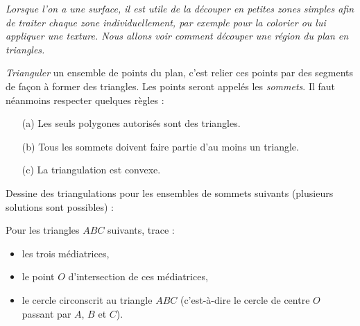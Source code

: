 \documentclass[class=report,crop=false, 12pt]{standalone}
\begin{document}

\emph{Lorsque l'on a une surface, il est utile de la découper en petites zones simples afin de traiter chaque zone individuellement, par exemple pour la colorier ou lui appliquer une texture. Nous allons voir comment découper une région du plan en triangles.}

\bigskip
\bigskip


\begin{activite}[Triangulation]

\emph{Trianguler} un ensemble de points du plan, c'est relier ces points par des segments de façon à former des triangles. Les points seront appelés les \emph{sommets}.
Il faut néanmoins respecter quelques règles : 
\begin{itemize}
  \item[(a)] Les seuls polygones autorisés sont des triangles.
  \item[(b)] Tous les sommets doivent faire partie d'au moins un triangle.
  \item[(c)] La triangulation est convexe.
\end{itemize}  
   
  
  \medskip
  


Dessine des triangulations pour les ensembles de sommets suivants (plusieurs solutions sont possibles) :
   
\end{activite}

\begin{activite}[Un triangle]

Pour les triangles $ABC$  suivants, trace :
\begin{itemize}
  \item les trois médiatrices,
  \item le point $O$ d'intersection de ces médiatrices,
  \item le cercle circonscrit au triangle $ABC$ (c'est-à-dire le cercle de centre $O$ passant par $A$, $B$ et $C$).
\end{itemize}

  
  

\end{activite}
\end{document}
